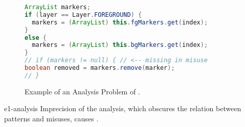 \begin{figure}[tb]
  \begin{lstlisting}[language=java]
ArrayList markers;
if (layer == Layer.FOREGROUND) {
  markers = (ArrayList) this.fgMarkers.get(index);
}
else {
  markers = (ArrayList) this.bgMarkers.get(index);
}
// if (markers != null) { // <-- missing in misuse
boolean removed = markers.remove(marker);
// }
  \end{lstlisting}
  \caption{Example of an Analysis Problem of \GROUMiner.}
  \label{lst:GrouMiner-miss-df}
\end{figure}

\begin{obs}{e1-analysis}
  Imprecision of the analysis, which obscures the relation between patterns and misuses, causes .
\end{obs}

%
%


